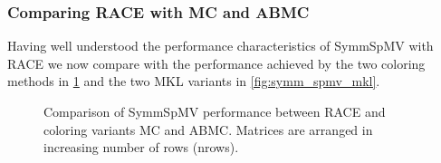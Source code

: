 \subsubsection{Comparing \acrshort{RACE} with \acrshort{MC} and \acrshort{ABMC}}
%


Having well understood the performance characteristics of  \acrshort{SymmSpMV} with \acrshort{RACE} we now compare with the performance achieved by the two coloring methods in \cref{fig:symm_spmv} and the two \acrshort{MKL} variants in \cref{fig:symm_spmv_mkl}. 


\begin{figure}[thbp]
	\centering
	\hspace{1em}
	\caption{Comparison of \acrshort{SymmSpMV} performance between \acrshort{RACE} and coloring variants \acrshort{MC} and \acrshort{ABMC}. Matrices are arranged in increasing number of rows (\acrshort{nrows}).}
	\label{fig:symm_spmv}
\end{figure}

